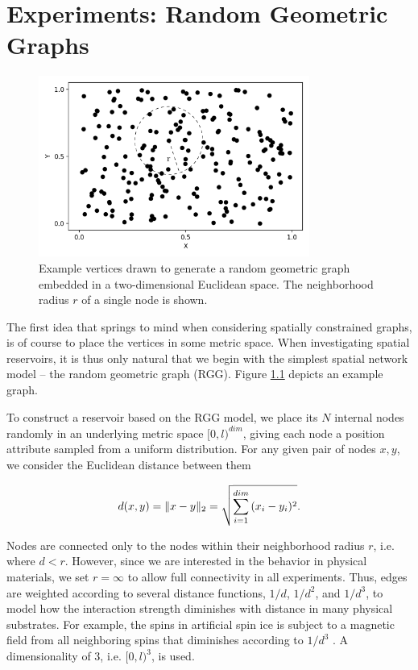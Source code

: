 \chapter{Experiments: Random Geometric Graphs}
\label{ch:rgg}

\begin{figure}[t]
  \centering
  \includegraphics[width=3.5in]{figures/RGG-example.png}
  \caption{
    Example vertices drawn to generate a random geometric graph embedded in a
two-dimensional Euclidean space. The neighborhood radius $r$ of a single node is
shown.
  }
  \label{fig:rgg-example}
\end{figure}

The first idea that springs to mind when considering spatially constrained
graphs, is of course to place the vertices in some metric space. When
investigating spatial reservoirs, it is thus only natural that we begin with the
simplest spatial network model -- the random geometric graph (RGG). Figure
\ref{fig:rgg-example} depicts an example graph.

To construct a reservoir based on the RGG model, we place its $N$ internal nodes
randomly in an underlying metric space $[0, l)^{dim}$, giving each node a
position attribute sampled from a uniform distribution. For any given pair of
nodes $x, y$, we consider the Euclidean distance between them

\begin{equation}
  d(x, y) = \Vert x-y \Vert_{2} = \sqrt{\sum_{i=1}^{dim}{(x_{i}-y_{i})^2}}.
  \label{eq:rgg-dist}
\end{equation}

Nodes are connected only to the nodes within their neighborhood radius $r$,
i.e. where $d < r$. However, since we are interested in the behavior in physical
materials, we set $r = \infty$ to allow full connectivity in all
experiments. Thus, edges are weighted according to several distance functions,
$1/d$, $1/d^2$, and $1/d^3$, to model how the interaction strength diminishes
with distance in many physical substrates. For example, the spins in artificial
spin ice is subject to a magnetic field from all neighboring spins that
diminishes according to $1/d^3$ \cite{jensen_computation_2018}. A dimensionality
of 3, i.e. $[0, l)^{3}$, is used.

